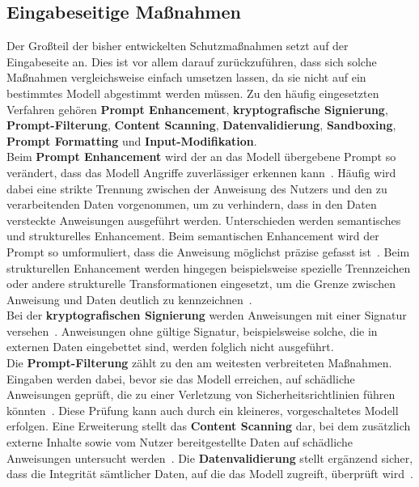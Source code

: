 \subsection{Eingabeseitige Maßnahmen}

Der Großteil der bisher entwickelten Schutzmaßnahmen setzt auf der Eingabeseite an. Dies ist vor allem darauf zurückzuführen, dass sich solche Maßnahmen vergleichsweise
einfach umsetzen lassen, da sie nicht auf ein bestimmtes Modell abgestimmt werden müssen. Zu den häufig eingesetzten Verfahren gehören \textbf{Prompt Enhancement}, 
\textbf{kryptografische Signierung}, \textbf{Prompt-Filterung}, \textbf{Content Scanning}, \textbf{Datenvalidierung}, \textbf{Sandboxing}, 
\textbf{Prompt Formatting} und \textbf{Input-Modifikation}. \\
Beim \textbf{Prompt Enhancement} wird der an das Modell übergebene Prompt so verändert, dass das Modell Angriffe zuverlässiger erkennen kann~\cite[7]{sm09}. Häufig wird
dabei eine strikte Trennung zwischen der Anweisung des Nutzers und den zu verarbeitenden Daten vorgenommen, um zu verhindern, dass in den Daten versteckte Anweisungen
ausgeführt werden. Unterschieden werden semantisches und strukturelles Enhancement. Beim semantischen Enhancement wird der Prompt so umformuliert, dass die Anweisung
möglichst präzise gefasst ist~\cite[55]{sm11}. Beim strukturellen Enhancement werden hingegen beispielsweise spezielle Trennzeichen oder andere strukturelle
Transformationen eingesetzt, um die Grenze zwischen Anweisung und Daten deutlich zu kennzeichnen~\cite[7]{sm09}\cite[55]{sm11}. \\
Bei der \textbf{kryptografischen Signierung} werden Anweisungen mit einer Signatur versehen~\cite[4]{pi9}. Anweisungen ohne gültige Signatur, beispielsweise solche, die in externen
Daten eingebettet sind, werden folglich nicht ausgeführt. \\
Die \textbf{Prompt-Filterung} zählt zu den am weitesten verbreiteten Maßnahmen. Eingaben werden dabei, bevor sie das Modell erreichen, auf schädliche Anweisungen geprüft, die zu
einer Verletzung von Sicherheitsrichtlinien führen könnten~\cite{sm04}. Diese Prüfung kann auch durch ein kleineres, vorgeschaltetes Modell erfolgen. Eine Erweiterung
stellt das \textbf{Content Scanning} dar, bei dem zusätzlich externe Inhalte sowie vom Nutzer bereitgestellte Daten auf schädliche Anweisungen untersucht werden~\cite{sm04}.
Die \textbf{Datenvalidierung} stellt ergänzend sicher, dass die Integrität sämtlicher Daten, auf die das Modell zugreift, überprüft wird~\cite{sm04}. \\
